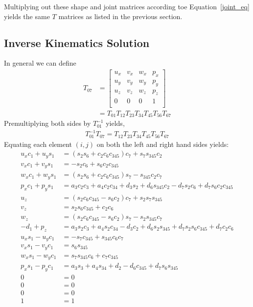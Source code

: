 \documentclass{article}
\begin{document}
Multiplying out these shape and joint matrices according toe Equation~\ref{joint_eq} yields the same $T$ matrices as listed in the previous section.

\subsection{Inverse Kinematics Solution}
In general we can define
\begin{align*}
T_{07} &=
\left[\begin{matrix}
u_x & v_x & w_x & p_x \\
u_y & v_y & w_y & p_y \\
u_z & v_z & w_z & p_z \\
  0 &   0 &   0 &   1 \\
\end{matrix}\right]\\
&= T_{01} T_{12} T_{23} T_{34} T_{45} T_{56} T_{67}
\end{align*}
Premultiplying both sides by $T_{01}^{-1}$ yields,
\begin{align*}
T_{01}^{-1} T_{07} = T_{12} T_{23} T_{34} T_{45} T_{56} T_{67}
\end{align*}
Equating each element $(i,j)$ on both the left and right hand sides yields:
\begin{align}
u_x c_1 + u_y s_1 &= \left(s_{2} s_{6} + c_{2} c_{6} c_{345}\right) c_{7} + s_{7} s_{345} c_{2} \label{eq1} \\
v_x c_1 + v_y s_1 &= - s_{2} c_{6} + s_{6} c_{2} c_{345} \label{eq5} \\
w_x c_1 + w_y s_1 &= \left(s_{2} s_{6} + c_{2} c_{6} c_{345}\right) s_{7} - s_{345} c_{2} c_{7} \label{eq7} \\
p_x c_1 + p_y s_1 &= a_{3} c_{2} c_{3} + a_{4} c_{2} c_{34} + d_{3} s_{2} + d_{6} s_{345} c_{2} - d_{7} s_{2} c_{6} + d_{7} s_{6} c_{2} c_{345} \label{eq3} \\
u_z                 &= \left(s_{2} c_{6} c_{345} - s_{6} c_{2}\right) c_{7} + s_{2} s_{7} s_{345} \label{eq2} \\
v_z                 &= s_{2} s_{6} c_{345} + c_{2} c_{6} \label{eq6} \\
w_z                 &= \left(s_{2} c_{6} c_{345} - s_{6} c_{2}\right) s_{7} - s_{2} s_{345} c_{7} \label{eq8} \\
- d_{1} + p_z       &= a_{3} s_{2} c_{3} + a_{4} s_{2} c_{34} - d_{3} c_{2} + d_{6} s_{2} s_{345} + d_{7} s_{2} s_{6} c_{345} + d_{7} c_{2} c_{6} \label{eq4} \\
u_x s_1 - u_y c_1 &= - s_{7} c_{345} + s_{345} c_{6} c_{7} \label{th51}\\
v_x s_1 - v_y c_1 &= s_{6} s_{345} \label{th53} \\
w_x s_1 - w_y c_1 &= s_{7} s_{345} c_{6} + c_{7} c_{345} \label{th52} \\
p_x s_1 - p_y c_1 &= a_{3} s_{3} + a_{4} s_{34} + d_{2} - d_{6} c_{345} + d_{7} s_{6} s_{345} \\
0                     &= 0 \\
0                     &= 0 \\
0                     &= 0 \\
1                     &= 1
\end{align}
\end{document}
